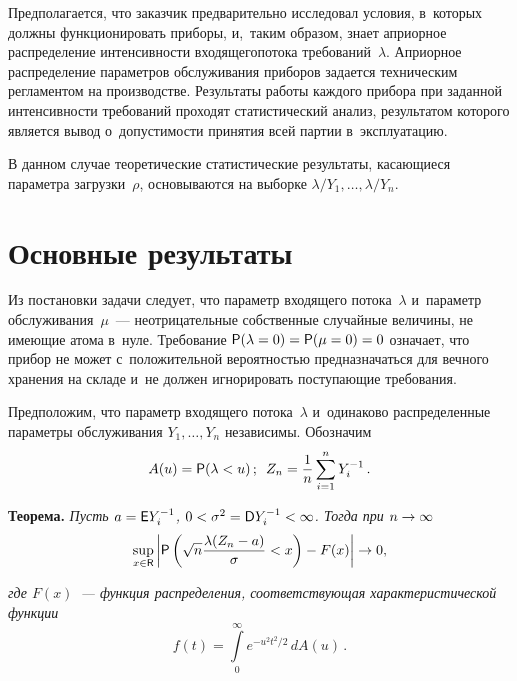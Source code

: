 \begin{multicols}{2}
Предполагается, что заказчик предварительно 
исследовал условия, в~которых должны функционировать приборы, и,~таким образом, 
знает априорное распределение интенсивности входящего\linebreak потока требований~$\lambda$. 
Априорное распределение параметров обслуживания приборов задается техническим 
регламентом на производстве. Результаты работы каждого прибора при заданной 
интенсивности требований проходят статистический анализ, результатом 
которого является вывод о~допустимости принятия всей партии в~экс\-плу\-а\-та\-цию.
{

}

В данном случае теоретические статистические результаты, касающиеся 
параметра загрузки~$\rho$, основываются на выборке
 $\lambda/Y_1,\ldots,\lambda/Y_n$.

\section{Основные результаты}


Из постановки задачи следует, что параметр входящего потока~$\lambda$ и~параметр 
обслуживания~$\mu$~--- не\-от\-ри\-ца\-тель\-ные собственные случайные величины, не имеющие 
атома в~нуле. Требование ${\sf P}(\lambda=0)\hm={\sf P}(\mu=0)\hm=0$ 
означает, что прибор не может с~положительной вероятностью предназначаться 
для вечного хранения на складе и~не должен игнорировать поступающие требования.

Предположим, что параметр входящего потока~$\lambda$ и~одинаково распределенные 
параметры обслуживания $Y_1,\ldots,Y_n$ независимы. Обозначим 
$$
A(u)={\sf P}(\lambda<u)\,;
\enskip 
Z_n=\displaystyle\frac{\displaystyle 1\mathstrut}{\displaystyle n\mathstrut}\sum\limits_{i=1}^{n}Y_i^{-1}\,.
$$

\noindent
\textbf{Теорема.} \textit{Пусть $a\hm={\sf E} Y_i^{-1}$, $0\hm<\sigma^2\hm={\sf D} 
Y_i^{-1}\hm<\infty$. Тогда при $n\hm\to\infty$}
\begin{equation}
\label{lim_1}
\sup\limits_{x\in \mathsf{R}}\left\vert{\sf P}\left(\sqrt{n}\frac{\lambda(Z_n- a)}{\sigma}<x\right)-F(x)\right\vert\to 0,
\end{equation}

\noindent
\textit{где $F(x)$~--- функция распределения, со\-от\-вет\-ст\-ву\-ющая 
характеристической функции}
$$
f(t)=\int\limits_{0}^{\infty}e^{-u^2t^2/2}\,dA(u)\,.
$$


\end{multicols}
